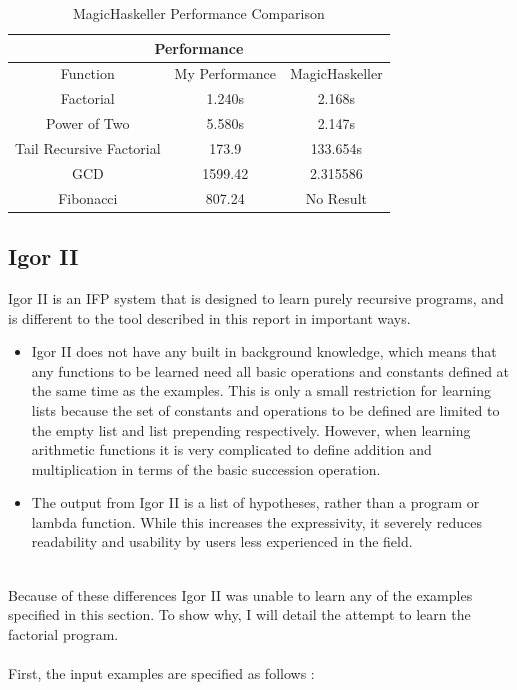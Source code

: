 \begin{table}[p!]
\centering
\begin{tabular}{|c|c|c|}
\hline
\multicolumn{3}{|c|}{\textbf{Performance}}\\
\hline
Function & My Performance & MagicHaskeller \\
\hline
Factorial & 1.240s & 2.168s\\
\hline
Power of Two & 5.580s & 2.147s\\
\hline
Tail Recursive Factorial & 173.9 & 133.654s\\
\hline
GCD & 1599.42 & 2.315586 \\
\hline
Fibonacci & 807.24 & No Result\\
\hline
\end{tabular}
\caption{MagicHaskeller Performance Comparison }
\label{table:2}
\end{table}

\pagebreak

\subsection{Igor II}
Igor II \cite{Kitzelmann2006} is an IFP system that is designed to learn purely recursive programs, and is different to the tool described in this report in important ways.
\begin{itemize}
\item Igor II does not have any built in background knowledge, which means that any functions to be learned need all basic operations and constants defined at the same time as the examples. This is only a small restriction for learning lists because the set of constants and operations to be defined are limited to the empty list and list prepending respectively. However, when learning arithmetic functions it is very complicated to define addition and multiplication in terms of the basic succession operation.
\item The output from Igor II is a list of hypotheses, rather than a program or lambda function. While this increases the expressivity, it severely reduces readability and usability by users less experienced in the field.
\end{itemize}
\mbox{}\\
Because of these differences Igor II was unable to learn any of the examples specified in this section. To show why, I will detail the attempt to learn the factorial program. \\ \\
First, the input examples are specified as follows : \\

